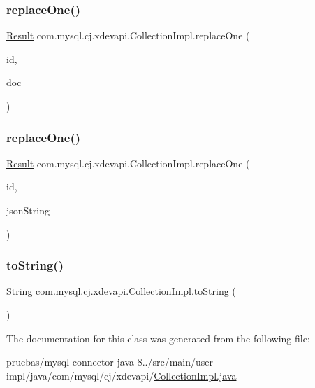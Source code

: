 \subsubsection{\texorpdfstring{replace\+One()}{replaceOne()}\hspace{0.1cm}{\footnotesize\ttfamily [1/2]}}
{\footnotesize\ttfamily \mbox{\hyperlink{interfacecom_1_1mysql_1_1cj_1_1xdevapi_1_1_result}{Result}} com.\+mysql.\+cj.\+xdevapi.\+Collection\+Impl.\+replace\+One (\begin{DoxyParamCaption}\item[{String}]{id,  }\item[{\mbox{\hyperlink{interfacecom_1_1mysql_1_1cj_1_1xdevapi_1_1_db_doc}{Db\+Doc}}}]{doc }\end{DoxyParamCaption})}

\mbox{\label{classcom_1_1mysql_1_1cj_1_1xdevapi_1_1_collection_impl_a42447696000df5bed9553ec3e6b90b23}} 
\subsubsection{\texorpdfstring{replace\+One()}{replaceOne()}\hspace{0.1cm}{\footnotesize\ttfamily [2/2]}}
{\footnotesize\ttfamily \mbox{\hyperlink{interfacecom_1_1mysql_1_1cj_1_1xdevapi_1_1_result}{Result}} com.\+mysql.\+cj.\+xdevapi.\+Collection\+Impl.\+replace\+One (\begin{DoxyParamCaption}\item[{String}]{id,  }\item[{String}]{json\+String }\end{DoxyParamCaption})}

\mbox{\label{classcom_1_1mysql_1_1cj_1_1xdevapi_1_1_collection_impl_ab585b5f987e9f5be94a9f0e5fd46e8dc}} 
\subsubsection{\texorpdfstring{to\+String()}{toString()}}
{\footnotesize\ttfamily String com.\+mysql.\+cj.\+xdevapi.\+Collection\+Impl.\+to\+String (\begin{DoxyParamCaption}{ }\end{DoxyParamCaption})}



The documentation for this class was generated from the following file\+:\begin{DoxyCompactItemize}
\item 
pruebas/mysql-\/connector-\/java-\/8../src/main/user-\/impl/java/com/mysql/cj/xdevapi/\mbox{\hyperlink{_collection_impl_8java}{Collection\+Impl.\+java}}\end{DoxyCompactItemize}
